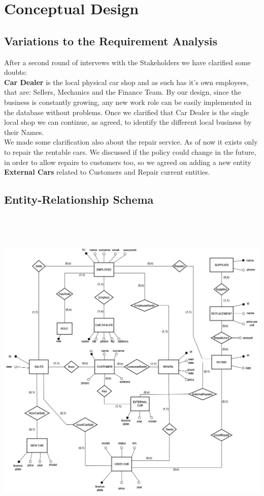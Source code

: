 \section{Conceptual Design}

\subsection{Variations to the Requirement Analysis}

After a second round of intervews with the Stakeholders we have clarified some doubts: \\
\textbf{Car Dealer} is the local physical car shop and as such has it's own employees, that are: Sellers, Mechanics and the Finance Team. By our design, since the business is constantly growing, any new work role can be easily implemented in the database without problems. Once we clarified that Car Dealer is the single local shop we can continue, as agreed, to identify the different local business by their Names. \\
We made some clarification also about the repair service. As of now it exists only to repair the rentable cars. We discussed if the policy could change in the future, in order to allow repairs to customers too, so we agreed on adding a new entity \textbf{External Cars} related to Customers and Repair current entities. 

\subsection{Entity-Relationship Schema}
\includegraphics[width=19cm, height=16cm]{ER_final.png}

